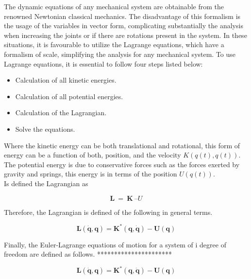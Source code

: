 \documentclass{UoNMCHA}
\numberwithin{equation}{section}
\begin{document}
The dynamic equations of any mechanical system are obtainable from the renowned Newtonian classical mechanics. The disadvantage of this formalism is the usage of the variables in vector form, complicating substantially the analysis when increasing the joints or if there are rotations present in the system. In these situations, it is favourable to utilize the Lagrange equations, which have a formalism of scale, simplifying the analysis for any mechanical system. To use Lagrange equations, it is essential to follow four steps listed below:

\begin{itemize}
\item Calculation of all kinetic energies.
\item Calculation of all potential energies.
\item Calculation of the Lagrangian.
\item Solve the equations.

\end{itemize}

Where the kinetic energy can be both translational and rotational, this form of energy can be a function of both, position, and the velocity $K(q(t), q(t))$. \\
The potential energy is due to conservative forces such as the forces exerted by gravity and springs, this energy is in terms of the position $U(q(t))$. \\
Is defined the Lagrangian as

\begin{equation}
	\mathbf{L}\ =\ \mathbf{K}\ – U
\end{equation}

Therefore, the Lagrangian is defined of the following in general terms.

\begin{equation}
\mathbf{L}\left(\dot{\mathbf{q}},\mathbf{q}\right)=\mathbf{K}^\ast\left(\mathbf{q},\dot{\mathbf{q}}\right)-\mathbf{U}\left(\mathbf{q}\right)
\end{equation}

Finally, the Euler-Lagrange equations of motion for a system of i degree of freedom are defined as follows. **********************

\begin{equation}
\mathbf{L}\left(\dot{\mathbf{q}},\mathbf{q}\right)=\mathbf{K}^\ast\left(\mathbf{q},\dot{\mathbf{q}}\right)-\mathbf{U}\left(\mathbf{q}\right)
\end{equation}
\end{document}

